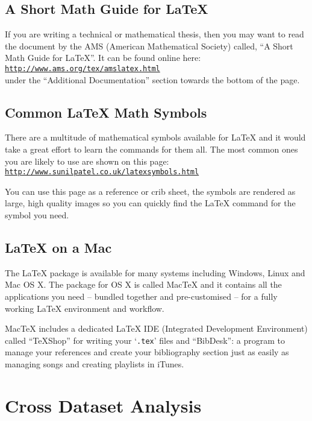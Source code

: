 \subsection{A Short Math Guide for \LaTeX{}}

If you are writing a technical or mathematical thesis, then you may want to read the document by the AMS (American Mathematical Society) called, ``A Short Math Guide for \LaTeX{}''. It can be found online here:\\
\href{http://www.ams.org/tex/amslatex.html}{\texttt{http://www.ams.org/tex/amslatex.html}}\\
under the ``Additional Documentation'' section towards the bottom of the page.

\subsection{Common \LaTeX{} Math Symbols}
There are a multitude of mathematical symbols available for \LaTeX{} and it would take a great effort to learn the commands for them all. The most common ones you are likely to use are shown on this page:\\
\href{http://www.sunilpatel.co.uk/latexsymbols.html}{\texttt{http://www.sunilpatel.co.uk/latexsymbols.html}}

You can use this page as a reference or crib sheet, the symbols are rendered as large, high quality images so you can quickly find the \LaTeX{} command for the symbol you need.

\subsection{\LaTeX{} on a Mac}
 
The \LaTeX{} package is available for many systems including Windows, Linux and Mac OS X. The package for OS X is called MacTeX and it contains all the applications you need -- bundled together and pre-customised -- for a fully working \LaTeX{} environment and workflow.
 
MacTeX includes a dedicated \LaTeX{} IDE (Integrated Development Environment) called ``TeXShop'' for writing your `\texttt{.tex}' files and ``BibDesk'': a program to manage your references and create your bibliography section just as easily as managing songs and creating playlists in iTunes.




\section{Cross Dataset Analysis}

